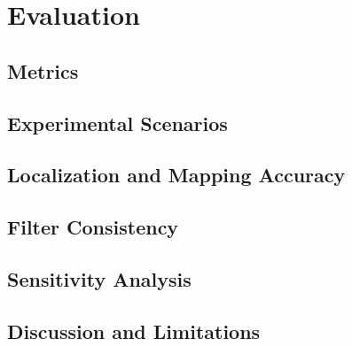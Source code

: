 \chapter{Evaluation}
\label{chap:evaluation}

\section{Metrics}
\label{sec:evaluation-metrics}

\section{Experimental Scenarios}
\label{sec:evaluation-scenarios}

\section{Localization and Mapping Accuracy}
\label{sec:evaluation-accuracy}

\section{Filter Consistency}
\label{sec:evaluation-consistency}

\section{Sensitivity Analysis}
\label{sec:evaluation-sensitivity}

\section{Discussion and Limitations}
\label{sec:evaluation-discussion}
